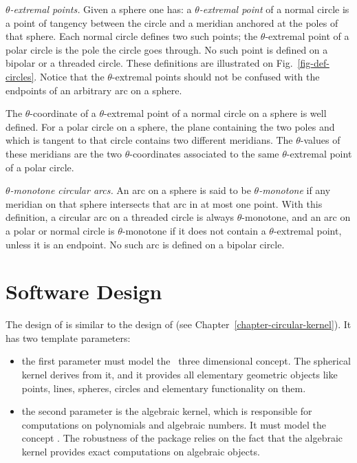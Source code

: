 \textit{$\theta$-extremal points.}
Given a sphere one has:
a \textit{$\theta$-extremal point} of a normal circle is a point of
tangency between the circle and a meridian anchored at the poles of
that sphere.  Each normal circle defines two such points;
the $\theta$-extremal point of a polar circle is the pole the circle
goes through.  No such point is defined on a bipolar or a threaded
circle. 
These definitions are illustrated on Fig.~\ref{fig-def-circles}.
Notice that the $\theta$-extremal points should not be confused with
the endpoints of an arbitrary arc on a sphere.

The $\theta$-coordinate of a $\theta$-extremal point of a normal
circle on a sphere is well defined.
For a polar circle on a sphere, the plane containing the two poles and which is
tangent to that circle contains two different meridians. The
$\theta$-values of these meridians are the two $\theta$-coordinates
associated to the same $\theta$-extremal point of a polar circle.

\textit{$\theta$-monotone circular arcs.}
An arc on a sphere is said to be \textit{$\theta$-monotone} if any meridian
on that sphere intersects that arc in at most one point. With this definition, a
circular arc on a threaded circle is always $\theta$-monotone, and an
arc on a polar or normal circle is $\theta$-monotone if it does not
contain a $\theta$-extremal point, unless it is an endpoint. No such
arc is defined on a bipolar circle.

\section{Software Design}

The design of  is similar to the design of
 (see Chapter~\ref{chapter-circular-kernel}). 
It has two template parameters:
\begin{itemize}
\item {} the first parameter must model the \cgal\ 
three dimensional  concept. The spherical kernel derives
from it, and it provides all elementary geometric objects like points,
lines, spheres, circles and elementary functionality on them.
\item {} the second parameter is the algebraic kernel, which is 
responsible for computations on polynomials and algebraic numbers. It 
must model the concept \ccc{AlgebraicKernelForSpheres}. The
robustness of the package relies on the fact that the algebraic kernel
provides exact computations on algebraic objects.
\end{itemize}

